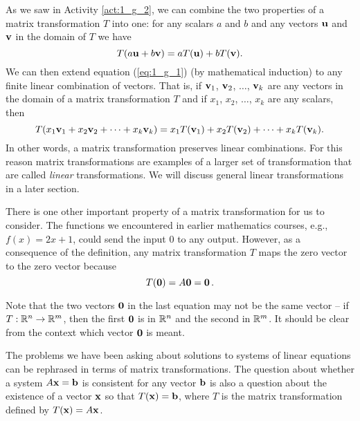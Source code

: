 As we saw in Activity \ref{act:1_g_2}, we can combine the two properties of a matrix transformation $T$ into one: for any scalars $a$ and $b$ and any vectors $\mathbf{u}$ and $\mathbf{v}$ in the domain of $T$ we have  
\begin{equation} \label{eq:1_g_1}
T(a\mathbf{u}+b\mathbf{v}) = aT(\mathbf{u}) + bT(\mathbf{v}).
\end{equation}
 We can then extend equation (\ref{eq:1_g_1}) (by mathematical induction) to any finite linear combination of vectors. That is, if $\mathbf{v}_1$, $\mathbf{v}_2$, $\ldots$, $\mathbf{v}_k$ are any vectors in the domain of a matrix transformation $T$ and if $x_1$, $x_2$, $\ldots$, $x_k$ are any scalars, then
\begin{equation} \label{eq:1_g_2}
T(x_1 \mathbf{v}_1 + x_2 \mathbf{v}_2 + \cdots + x_k \mathbf{v}_k) = x_1 T(\mathbf{v}_1) + x_2 T(\mathbf{v}_2) + \cdots + x_k T(\mathbf{v}_k).
\end{equation}
In other words, a matrix transformation preserves linear combinations. For this reason matrix transformations are examples of a larger set of transformation that are called \emph{linear} transformations. We will discuss general linear transformations in a later section.
 

There is one other important property of a matrix transformation for us to consider. The functions we encountered in earlier mathematics courses, e.g., $f(x) = 2x+1$, could send the input 0 to any output. However, as a consequence of the definition, any matrix transformation $T$ maps the zero vector to the zero vector because
\[ T(\mathbf{0}) = A\mathbf{0} = \mathbf{0} \,.\]

Note that the two vectors $\mathbf{0}$ in the last equation may not be the same vector -- if $T : \mathbb{R}^n \to \mathbb{R}^m$, then the first $\mathbf{0}$ is in $\mathbb{R}^n$ and the second in $\mathbb{R}^m$. It should be clear from the context which vector $\mathbf{0}$ is meant. 



The problems we have been asking about solutions to systems of linear equations can be rephrased in terms of matrix transformations. The question about whether a system $A \mathbf{x} = \mathbf{b}$ is consistent for any vector $\mathbf{b}$ is also a question about the existence of a vector $\mathbf{x}$ so that $T(\mathbf{x}) = \mathbf{b}$, where $T$ is the matrix transformation defined by $T(\mathbf{x}) = A \mathbf{x}$. 


